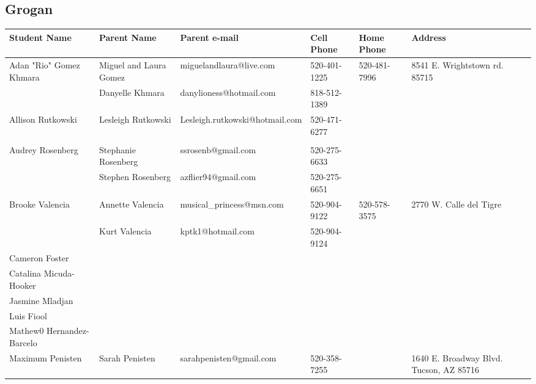 \documentclass[landscape]{article}\usepackage[]{graphicx}\usepackage[]{color}
\begin{document}
\subsection{Grogan}
\begin{longtable}{|p{100pt}|p{100pt}|p{140pt}|p{60pt}|p{64pt}|p{120pt}|}
\textbf{Student Name} & \textbf{Parent Name} & \textbf{Parent e-mail} & \textbf{Cell Phone} & \textbf{Home Phone} & \textbf{Address}\\
\hline
\hline
\multirow{2}{100pt}{Adan "Rio" Gomez Khmara} & Miguel and Laura Gomez & miguelandlaura@live.com & 520-401-1225 & 520-481-7996 & \multirow{2}{120pt}{8541 E. Wrightstown rd. 85715} \\
 & Danyelle Khmara & danylioness@hotmail.com & 818-512-1389 &  & \\
\hline
\multirow{2}{100pt}{Allison Rutkowski} & Lesleigh Rutkowski  & Lesleigh.rutkowski@hotmail.com & 520-471-6277 &  & \multirow{2}{120pt}{} \\
 &  &  &  &  & \\
\hline
\multirow{2}{100pt}{Audrey Rosenberg} & Stephanie Rosenberg & ssrosenb@gmail.com & 520-275-6633 &  & \multirow{2}{120pt}{} \\
 & Stephen Rosenberg & azflier94@gmail.com & 520-275-6651 &  & \\
\hline
\multirow{2}{100pt}{Brooke Valencia} & Annette Valencia & musical\_princess@msn.com & 520-904-9122 & 520-578-3575 & \multirow{2}{120pt}{2770 W. Calle del Tigre} \\
 & Kurt Valencia & kptk1@hotmail.com & 520-904-9124 &  & \\
\hline
\multirow{2}{100pt}{Cameron Foster} &  &  &  &  & \multirow{2}{120pt}{} \\
 &  &  &  &  & \\
\hline
\multirow{2}{100pt}{Catalina Micuda-Hooker} &  &  &  &  & \multirow{2}{120pt}{} \\
 &  &  &  &  & \\
\hline
\multirow{2}{100pt}{Jasmine Mladjan} &  &  &  &  & \multirow{2}{120pt}{} \\
 &  &  &  &  & \\
\hline
\multirow{2}{100pt}{Luis Fiool} &  &  &  &  & \multirow{2}{120pt}{} \\
 &  &  &  &  & \\
\hline
\multirow{2}{100pt}{Mathew0 Hernandez-Barcelo} &  &  &  &  & \multirow{2}{120pt}{} \\
 &  &  &  &  & \\
\hline
\multirow{2}{100pt}{Maximum Penisten} & Sarah Penisten & sarahpenisten@gmail.com & 520-358-7255 &  & \multirow{2}{120pt}{1640 E. Broadway Blvd. Tucson, AZ 85716} \\

\end{longtable}
\end{document}
